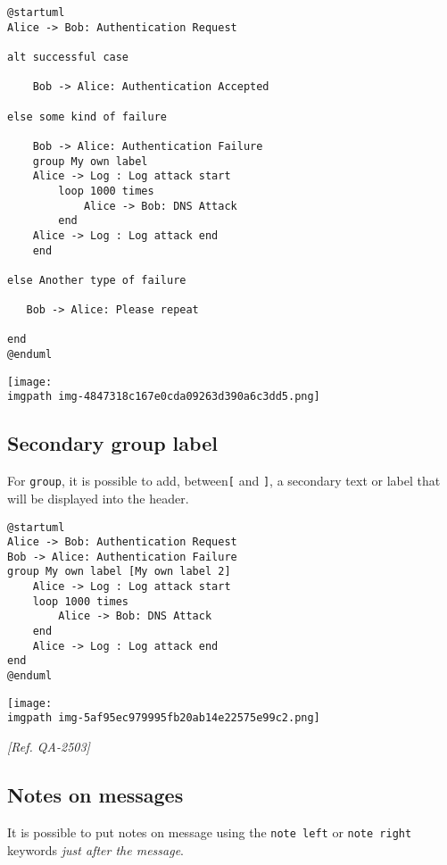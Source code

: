 \begin{verbatim}
@startuml
Alice -> Bob: Authentication Request

alt successful case

    Bob -> Alice: Authentication Accepted

else some kind of failure

    Bob -> Alice: Authentication Failure
    group My own label
    Alice -> Log : Log attack start
        loop 1000 times
            Alice -> Bob: DNS Attack
        end
    Alice -> Log : Log attack end
    end

else Another type of failure

   Bob -> Alice: Please repeat

end
@enduml
\end{verbatim}
\begin{center}
\texttt{[image: \\imgpath img-4847318c167e0cda09263d390a6c3dd5.png]}
\end{center}
%
%
\subsection{Secondary group label}


For \texttt{group}, it is possible to add, between\texttt{[} and \texttt{]}, a secondary text or label that will be displayed into the header.


\begin{verbatim}
@startuml
Alice -> Bob: Authentication Request
Bob -> Alice: Authentication Failure
group My own label [My own label 2]
    Alice -> Log : Log attack start
    loop 1000 times
        Alice -> Bob: DNS Attack
    end
    Alice -> Log : Log attack end
end
@enduml
\end{verbatim}
\begin{center}
\texttt{[image: \\imgpath img-5af95ec979995fb20ab14e22575e99c2.png]}
\end{center}


\textit{[Ref. QA-2503]}
%
%
\subsection{Notes on messages}


It is possible to put notes on message using the \texttt{note left}
or \texttt{note right} keywords \textit{just after the message}.


